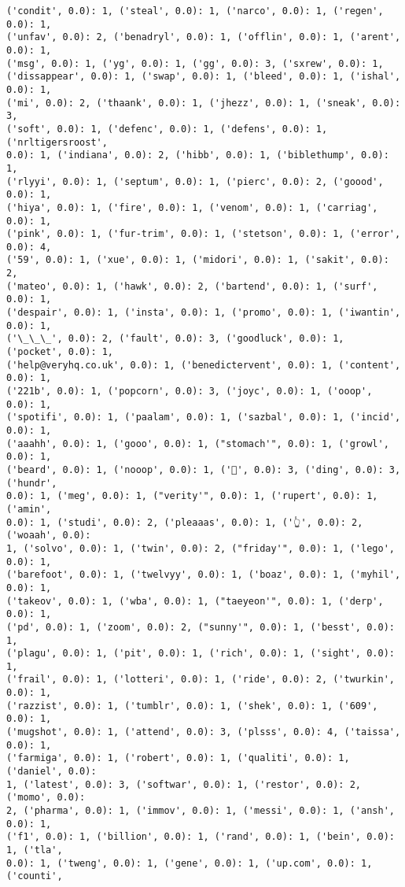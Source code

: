 \documentclass[11pt]{article}
\begin{document}
\begin{Verbatim}[commandchars=\\\{\}]
('condit', 0.0): 1, ('steal', 0.0): 1, ('narco', 0.0): 1, ('regen', 0.0): 1,
('unfav', 0.0): 2, ('benadryl', 0.0): 1, ('offlin', 0.0): 1, ('arent', 0.0): 1,
('msg', 0.0): 1, ('yg', 0.0): 1, ('gg', 0.0): 3, ('sxrew', 0.0): 1,
('dissappear', 0.0): 1, ('swap', 0.0): 1, ('bleed', 0.0): 1, ('ishal', 0.0): 1,
('mi', 0.0): 2, ('thaank', 0.0): 1, ('jhezz', 0.0): 1, ('sneak', 0.0): 3,
('soft', 0.0): 1, ('defenc', 0.0): 1, ('defens', 0.0): 1, ('nrltigersroost',
0.0): 1, ('indiana', 0.0): 2, ('hibb', 0.0): 1, ('biblethump', 0.0): 1,
('rlyyi', 0.0): 1, ('septum', 0.0): 1, ('pierc', 0.0): 2, ('goood', 0.0): 1,
('hiya', 0.0): 1, ('fire', 0.0): 1, ('venom', 0.0): 1, ('carriag', 0.0): 1,
('pink', 0.0): 1, ('fur-trim', 0.0): 1, ('stetson', 0.0): 1, ('error', 0.0): 4,
('59', 0.0): 1, ('xue', 0.0): 1, ('midori', 0.0): 1, ('sakit', 0.0): 2,
('mateo', 0.0): 1, ('hawk', 0.0): 2, ('bartend', 0.0): 1, ('surf', 0.0): 1,
('despair', 0.0): 1, ('insta', 0.0): 1, ('promo', 0.0): 1, ('iwantin', 0.0): 1,
('\_\_\_', 0.0): 2, ('fault', 0.0): 3, ('goodluck', 0.0): 1, ('pocket', 0.0): 1,
('help@veryhq.co.uk', 0.0): 1, ('benedictervent', 0.0): 1, ('content', 0.0): 1,
('221b', 0.0): 1, ('popcorn', 0.0): 3, ('joyc', 0.0): 1, ('ooop', 0.0): 1,
('spotifi', 0.0): 1, ('paalam', 0.0): 1, ('sazbal', 0.0): 1, ('incid', 0.0): 1,
('aaahh', 0.0): 1, ('gooo', 0.0): 1, ("stomach'", 0.0): 1, ('growl', 0.0): 1,
('beard', 0.0): 1, ('nooop', 0.0): 1, ('🎉', 0.0): 3, ('ding', 0.0): 3, ('hundr',
0.0): 1, ('meg', 0.0): 1, ("verity'", 0.0): 1, ('rupert', 0.0): 1, ('amin',
0.0): 1, ('studi', 0.0): 2, ('pleaaas', 0.0): 1, ('👆', 0.0): 2, ('woaah', 0.0):
1, ('solvo', 0.0): 1, ('twin', 0.0): 2, ("friday'", 0.0): 1, ('lego', 0.0): 1,
('barefoot', 0.0): 1, ('twelvyy', 0.0): 1, ('boaz', 0.0): 1, ('myhil', 0.0): 1,
('takeov', 0.0): 1, ('wba', 0.0): 1, ("taeyeon'", 0.0): 1, ('derp', 0.0): 1,
('pd', 0.0): 1, ('zoom', 0.0): 2, ("sunny'", 0.0): 1, ('besst', 0.0): 1,
('plagu', 0.0): 1, ('pit', 0.0): 1, ('rich', 0.0): 1, ('sight', 0.0): 1,
('frail', 0.0): 1, ('lotteri', 0.0): 1, ('ride', 0.0): 2, ('twurkin', 0.0): 1,
('razzist', 0.0): 1, ('tumblr', 0.0): 1, ('shek', 0.0): 1, ('609', 0.0): 1,
('mugshot', 0.0): 1, ('attend', 0.0): 3, ('plsss', 0.0): 4, ('taissa', 0.0): 1,
('farmiga', 0.0): 1, ('robert', 0.0): 1, ('qualiti', 0.0): 1, ('daniel', 0.0):
1, ('latest', 0.0): 3, ('softwar', 0.0): 1, ('restor', 0.0): 2, ('momo', 0.0):
2, ('pharma', 0.0): 1, ('immov', 0.0): 1, ('messi', 0.0): 1, ('ansh', 0.0): 1,
('f1', 0.0): 1, ('billion', 0.0): 1, ('rand', 0.0): 1, ('bein', 0.0): 1, ('tla',
0.0): 1, ('tweng', 0.0): 1, ('gene', 0.0): 1, ('up.com', 0.0): 1, ('counti',

\end{Verbatim}
\end{document}
